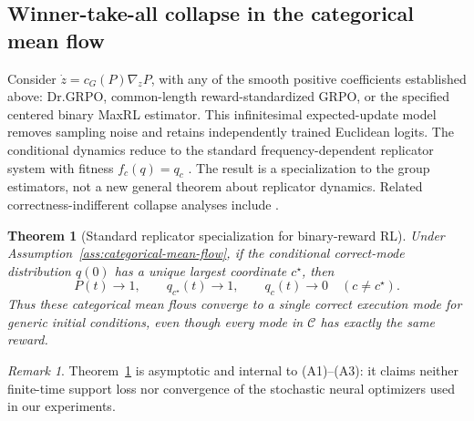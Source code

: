 \documentclass{article}
\newcommand{\enforcehalffinalproseline}{%
  \setlength{\parfillskip}{0pt plus .20\linewidth}}
\newcommand{\1}{\mathbf 1}
\newtheorem{theorem}[lemma]{Theorem}
\theoremstyle{remark}
\newtheorem{remark}[lemma]{Remark}
\theoremstyle{definition}
\theoremstyle{plain}
\begin{document}
\subsection{Winner-take-all collapse in the categorical mean flow}
\label{app:theory-collapse}

Consider $\dot z=c_G(P)\nabla_zP$, with any of the smooth positive
coefficients established above: Dr.GRPO, common-length reward-standardized
GRPO, or the specified centered binary MaxRL estimator. This infinitesimal
expected-update model removes
sampling noise and retains independently trained Euclidean logits. The
conditional dynamics reduce to the standard frequency-dependent replicator
system with fitness $f_c(q)=q_c$
\citep{hofbauer1998evolutionary,harper2009informationgeometry}. The result is
a specialization to the group estimators, not a new general theorem about
replicator dynamics. Related correctness-indifferent collapse analyses include
\citet{sinha2026expected,lochab2026ucpo}.

\begin{theorem}[Standard replicator specialization for binary-reward RL]
\enforcehalffinalproseline
\label{thm:grpo-collapse}
Under Assumption~\ref{ass:categorical-mean-flow}, if the conditional correct-mode
distribution $q(0)$ has a unique largest coordinate $c^\star$, then
\[
  P(t)\longrightarrow1,
  \qquad
  q_{c^\star}(t)\longrightarrow1,
  \qquad
  q_c(t)\longrightarrow0\quad(c\ne c^\star).
\]
Thus these categorical mean flows converge to a single correct execution
mode for generic initial conditions, even though every mode in $\mathcal C$
has exactly the same reward.
\end{theorem}

\begin{remark}
Theorem~\ref{thm:grpo-collapse} is asymptotic and internal to (A1)--(A3): it
claims neither finite-time support loss nor convergence of the stochastic
neural optimizers used in our experiments.
\end{remark}
\end{document}
